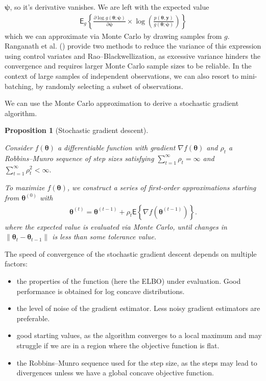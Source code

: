 \documentclass[
  11pt,
  letterpaper,
]{scrbook}
\providecommand{\tightlist}{%
  \setlength{\itemsep}{0pt}\setlength{\parskip}{0pt}}
\theoremstyle{definition}
\theoremstyle{plain}
\newtheorem{proposition}{Proposition}[chapter]
\theoremstyle{plain}
\theoremstyle{plain}
\theoremstyle{definition}
\theoremstyle{definition}
\theoremstyle{plain}
\newtheorem{proposition}{Proposition}[chapter]
\theoremstyle{plain}
\theoremstyle{remark}
\begin{document}
\(\boldsymbol{\psi}\), so it's derivative vanishes. We are left with the
expected value \begin{align*}
 \mathsf{E}_{g}\left\{\frac{\partial \log g(\boldsymbol{\theta}; \boldsymbol{\psi})}{\partial \boldsymbol{\psi}} \times \log \left( \frac{p(\boldsymbol{\theta}, \boldsymbol{y})}{g(\boldsymbol{\theta}; \boldsymbol{\psi})}\right)\right\}
\end{align*} which we can approximate via Monte Carlo by drawing samples
from \(g\). Ranganath et al. ()
provide two methods to reduce the variance of this expression using
control variates and Rao--Blackwellization, as excessive variance
hinders the convergence and requires larger Monte Carlo sample sizes to
be reliable. In the context of large samples of independent
observations, we can also resort to mini-batching, by randomly selecting
a subset of observations.

We can use the Monte Carlo approximation to derive a stochastic gradient
algorithm.

\begin{proposition}[Stochastic gradient
descent]\protect\hypertarget{prp-stoch-grad-descent}{}\label{prp-stoch-grad-descent}

Consider \(f(\boldsymbol{\theta})\) a differentiable function with
gradient \(\nabla f(\boldsymbol{\theta})\) and \(\rho_t\) a
Robbins--Munro sequence of step sizes satisfying
\(\sum_{t=1}^\infty \rho_t = \infty\) and
\(\sum_{t=1}^\infty \rho^2_t< \infty.\)

To maximize \(f(\boldsymbol{\theta})\), we construct a series of
first-order approximations starting from \(\boldsymbol{\theta}^{(0)}\)
with \begin{align*}
\boldsymbol{\theta}^{(t)} = \boldsymbol{\theta}^{(t-1)} +\rho_t  \mathsf{E}\left\{\nabla f(\boldsymbol{\theta}^{(t-1)})\right\}.
\end{align*} where the expected value is evaluated via Monte Carlo,
until changes in
\(\|\boldsymbol{\theta}_{t} - \boldsymbol{\theta}_{t-1}\|\) is less than
some tolerance value.

\end{proposition}

The speed of convergence of the stochastic gradient descent depends on
multiple factors:

\begin{itemize}
\tightlist
\item
  the properties of the function (here the ELBO) under evaluation. Good
  performance is obtained for log concave distributions.
\item
  the level of noise of the gradient estimator. Less noisy gradient
  estimators are preferable.
\item
  good starting values, as the algorithm converges to a local maximum
  and may struggle if we are in a region where the objective function is
  flat.
\item
  the Robbins--Munro sequence used for the step size, as the steps may
  lead to divergences unless we have a global concave objective
  function.
\end{itemize}
\end{document}
